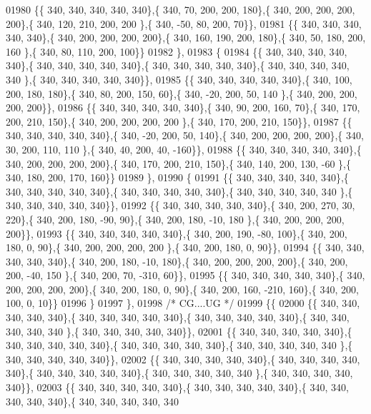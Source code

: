 \begin{DoxyCode}
01980 \{\{ 340, 340, 340, 340, 340\},\{ 340,  70, 200, 200, 180\},\{ 340, 200, 200, 200, 200\},\{ 340, 120, 210, 200, 200
      \},\{ 340, -50,  80, 200,  70\}\},
01981 \{\{ 340, 340, 340, 340, 340\},\{ 340, 200, 200, 200, 200\},\{ 340, 160, 190, 200, 180\},\{ 340,  50, 180, 200, 160
      \},\{ 340,  80, 110, 200, 100\}\}
01982 \},
01983 \{
01984 \{\{ 340, 340, 340, 340, 340\},\{ 340, 340, 340, 340, 340\},\{ 340, 340, 340, 340, 340\},\{ 340, 340, 340, 340, 340
      \},\{ 340, 340, 340, 340, 340\}\},
01985 \{\{ 340, 340, 340, 340, 340\},\{ 340, 100, 200, 180, 180\},\{ 340,  80, 200, 150,  60\},\{ 340, -20, 200,  50, 140
      \},\{ 340, 200, 200, 200, 200\}\},
01986 \{\{ 340, 340, 340, 340, 340\},\{ 340,  90, 200, 160,  70\},\{ 340, 170, 200, 210, 150\},\{ 340, 200, 200, 200, 200
      \},\{ 340, 170, 200, 210, 150\}\},
01987 \{\{ 340, 340, 340, 340, 340\},\{ 340, -20, 200,  50, 140\},\{ 340, 200, 200, 200, 200\},\{ 340,  30, 200, 110, 110
      \},\{ 340,  40, 200,  40, -160\}\},
01988 \{\{ 340, 340, 340, 340, 340\},\{ 340, 200, 200, 200, 200\},\{ 340, 170, 200, 210, 150\},\{ 340, 140, 200, 130, -60
      \},\{ 340, 180, 200, 170, 160\}\}
01989 \},
01990 \{
01991 \{\{ 340, 340, 340, 340, 340\},\{ 340, 340, 340, 340, 340\},\{ 340, 340, 340, 340, 340\},\{ 340, 340, 340, 340, 340
      \},\{ 340, 340, 340, 340, 340\}\},
01992 \{\{ 340, 340, 340, 340, 340\},\{ 340, 200, 270,  30, 220\},\{ 340, 200, 180, -90,  90\},\{ 340, 200, 180, -10, 180
      \},\{ 340, 200, 200, 200, 200\}\},
01993 \{\{ 340, 340, 340, 340, 340\},\{ 340, 200, 190, -80, 100\},\{ 340, 200, 180,   0,  90\},\{ 340, 200, 200, 200, 200
      \},\{ 340, 200, 180,   0,  90\}\},
01994 \{\{ 340, 340, 340, 340, 340\},\{ 340, 200, 180, -10, 180\},\{ 340, 200, 200, 200, 200\},\{ 340, 200, 200, -40, 150
      \},\{ 340, 200,  70, -310,  60\}\},
01995 \{\{ 340, 340, 340, 340, 340\},\{ 340, 200, 200, 200, 200\},\{ 340, 200, 180,   0,  90\},\{ 340, 200, 160, -210, 
      160\},\{ 340, 200, 100,   0,  10\}\}
01996 \}
01997 \},
01998 \textcolor{comment}{/* CG....UG */}
01999 \{\{
02000 \{\{ 340, 340, 340, 340, 340\},\{ 340, 340, 340, 340, 340\},\{ 340, 340, 340, 340, 340\},\{ 340, 340, 340, 340, 340
      \},\{ 340, 340, 340, 340, 340\}\},
02001 \{\{ 340, 340, 340, 340, 340\},\{ 340, 340, 340, 340, 340\},\{ 340, 340, 340, 340, 340\},\{ 340, 340, 340, 340, 340
      \},\{ 340, 340, 340, 340, 340\}\},
02002 \{\{ 340, 340, 340, 340, 340\},\{ 340, 340, 340, 340, 340\},\{ 340, 340, 340, 340, 340\},\{ 340, 340, 340, 340, 340
      \},\{ 340, 340, 340, 340, 340\}\},
02003 \{\{ 340, 340, 340, 340, 340\},\{ 340, 340, 340, 340, 340\},\{ 340, 340, 340, 340, 340\},\{ 340, 340, 340, 340, 340

\end{DoxyCode}
